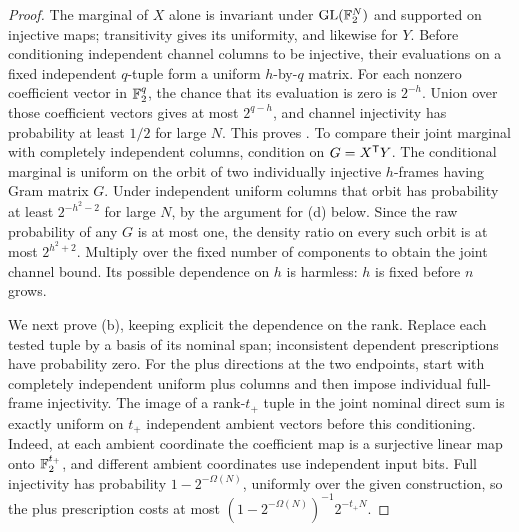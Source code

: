 \begin{proof}
The marginal of \(X\) alone is invariant under \(\operatorname{GL}(\mathbb F_2^N)\) and supported on injective maps; transitivity gives its uniformity, and likewise for \(Y\).
Before conditioning independent channel columns to be injective, their evaluations on a fixed independent \(q\)-tuple form a uniform \(h\)-by-\(q\) matrix.
For each nonzero coefficient vector in \(\mathbb F_2^q\), the chance that its evaluation is zero is \(2^{-h}\).
Union over those coefficient vectors gives at most \(2^{q-h}\), and channel injectivity has probability at least \(1/2\) for large \(N\).
This proves .
To compare their joint marginal with completely independent columns, condition on \(G=X^{\mathsf T} Y\).
The conditional marginal is uniform on the orbit of two individually injective \(h\)-frames having Gram matrix \(G\).
Under independent uniform columns that orbit has probability at least \(2^{-h^2-2}\) for large \(N\), by the argument for (d) below.
Since the raw probability of any \(G\) is at most one, the density ratio on every such orbit is at most \(2^{h^2+2}\).
Multiply over the fixed number of components to obtain the joint channel bound.
Its possible dependence on \(h\) is harmless: \(h\) is fixed before \(n\) grows.

We next prove (b), keeping explicit the dependence on the rank.
Replace each tested tuple by a basis of its nominal span; inconsistent dependent prescriptions have probability zero.
For the plus directions at the two endpoints, start with completely independent uniform plus columns and then impose individual full-frame injectivity.
The image of a rank-\(t_+\) tuple in the joint nominal direct sum is exactly uniform on \(t_+\) independent ambient vectors before this conditioning.
Indeed, at each ambient coordinate the coefficient map is a surjective linear map onto \(\mathbb F_2^{t_+}\), and different ambient coordinates use independent input bits.
Full injectivity has probability \(1-2^{-\Omega(N)}\), uniformly over the given construction, so the plus prescription costs at most
\((1-2^{-\Omega(N)})^{-1}2^{-t_+N}\).


\end{proof}
